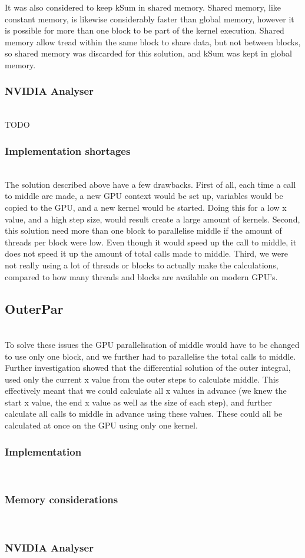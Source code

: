 It was also considered to keep kSum in shared memory. Shared memory, like constant memory, is likewise considerably faster than global memory, however it is possible for more than one block to be part of the kernel execution. Shared memory allow tread within the same block to share data, but not between blocks, so shared memory was discarded for this solution, and kSum was kept in global memory.

\subsubsection{NVIDIA Analyser} \hfill \\
TODO

\subsubsection{Implementation shortages} \hfill \\
The solution described above have a few drawbacks. First of all, each time a call to middle are made, a new GPU context would be set up, variables would be copied to the GPU, and a new kernel would be started. Doing this for a low x value, and a high step size, would result create a large amount of kernels. Second, this solution need more than one block to parallelise middle if the amount of threads per block were low. Even though it would speed up the call to middle, it does not speed it up the amount of total calls made to middle. Third, we were not really using a lot of threads or blocks to actually make the calculations, compared to how many threads and blocks are available on modern GPU’s.

\subsection{OuterPar} \hfill \\
To solve these issues the GPU parallelisation of middle would have to be changed to use only one block, and we further had to parallelise the total calls to middle. Further investigation showed that the differential solution of the outer integral, used only the current x value from the outer steps to calculate middle. This effectively meant that we could calculate all x values in advance (we knew the start x value, the end x value as well as the size of each step), and further calculate all calls to middle in advance using these values. These could all be calculated at once on the GPU using only one kernel.

\subsubsection{Implementation} \hfill \\

\subsubsection{Memory considerations} \hfill \\

\subsubsection{NVIDIA Analyser} \hfill \\